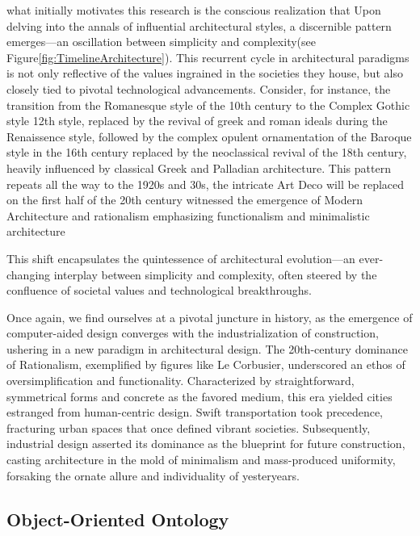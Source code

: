 what initially motivates this research is the conscious realization that
Upon delving into the annals of influential architectural styles, a discernible pattern emerges—an oscillation between simplicity and complexity(see Figure\ref{fig:TimelineArchitecture}).
This recurrent cycle in architectural paradigms is not only reflective of the values ingrained in the societies they house, but also closely tied to pivotal technological advancements.
Consider, for instance, the transition from the Romanesque style of the 10th century to the Complex Gothic style 12th style, replaced by the revival of greek and roman ideals during the Renaissence style, followed by the complex opulent ornamentation of the Baroque style in the 16th century replaced by the neoclassical revival of the 18th century, heavily influenced by classical Greek and Palladian architecture\cite{Arora2023}.
This pattern repeats all the way to the 1920s and 30s, the intricate Art Deco will be replaced on the first half of the 20th century witnessed the emergence of Modern Architecture and rationalism emphasizing functionalism and minimalistic architecture




This shift encapsulates the quintessence of architectural evolution—an ever-changing interplay between simplicity and complexity, often steered by the confluence of societal values and technological breakthroughs.


Once again, we find ourselves at a pivotal juncture in history, as the emergence of computer-aided design converges with the industrialization of construction, ushering in a new paradigm in architectural design.
The 20th-century dominance of Rationalism, exemplified by figures like Le Corbusier, underscored an ethos of oversimplification and functionality.
Characterized by straightforward, symmetrical forms and concrete as the favored medium, this era yielded cities estranged from human-centric design.
Swift transportation took precedence, fracturing urban spaces that once defined vibrant societies\cite{Stacbond2020}.
Subsequently, industrial design asserted its dominance as the blueprint for future construction\cite{Economakis2023}, casting architecture in the mold of minimalism and mass-produced uniformity, forsaking the ornate allure and individuality of yesteryears.

\subsection{Object-Oriented Ontology}
\label{subsec:ObjectOrientedOntology}

